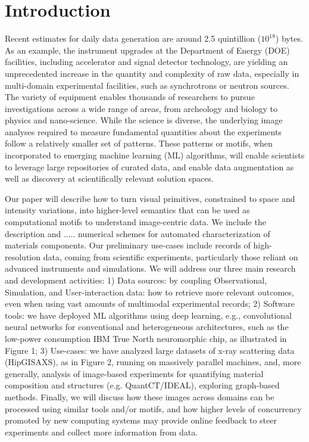 \section{Introduction}
Recent estimates for daily data generation are around 2.5 quintillion ($10^{18}$) bytes. As an example, the instrument upgrades at the Department of Energy (DOE) facilities, including accelerator and signal detector technology, are yielding an unprecedented increase in the quantity and complexity of raw data, especially in multi-domain experimental facilities, such as synchrotrons or neutron sources. The variety of equipment enables thousands of researchers to pursue investigations across a wide range of areas, from archeology and biology to physics and nano-science. While the science is diverse, the underlying image analyses required to measure fundamental quantities about the experiments follow a relatively smaller set of patterns. These patterns or motifs, when incorporated to emerging machine learning (ML) algorithms, will enable scientists to leverage large repositories of curated data, and enable data augmentation as well as discovery at scientifically relevant solution spaces.

Our paper will describe how to turn visual primitives, constrained to space and intensity variations, into higher-level semantics that can be used as computational motifs to understand image-centric data. We include the description and .....
 numerical schemes for automated characterization of materials components. Our preliminary use-cases include records of high-resolution data, coming from scientific experiments, particularly those reliant on advanced instruments and simulations. We will address our three main research and development activities:
1) Data sources: by coupling Observational, Simulation, and User-interaction data: how to retrieve
more relevant outcomes, even when using vast amounts of multimodal experimental records;
2) Software tools: we have deployed ML algorithms using deep learning, e.g., convolutional neural
networks for conventional and heterogeneous architectures, such as the low-power consumption IBM True
North neuromorphic chip, as illustrated in Figure 1;
3) Use-cases: we have analyzed large datasets of x-ray scattering data (HipGISAXS), as in Figure 2, running on massively parallel machines, and, more generally, analysis of image-based experiments for quantifying material composition and structures (e.g. QuantCT/IDEAL), exploring graph-based methods. Finally, we will discuss how these images across domains can be processed using similar tools and/or motifs, and how higher levels of concurrency promoted by new computing systems may provide online feedback to steer experiments and collect more information from data.

